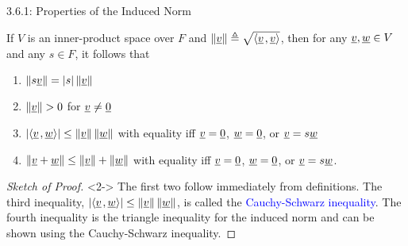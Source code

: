 \documentclass[10pt,english,aspectratio=169]{beamer}
\begin{document}
\begin{frame}{3.6.1: Properties of the Induced Norm}

\begin{theorem}
If $V$ is an inner-product space over $F$ and $\| \underline{v} \| \triangleq \sqrt{{\left\langle  \underline{v}  \mskip2mu ,  \underline{v}  \right\rangle}}$, then for any $\underline{v}, \underline{w} \in V$ and any $s\in F$, it follows that
\begin{enumerate}
\item $\left\| s \underline{v} \right\| = |s| \left\| \underline{v} \right\|$
\item $\left\| \underline{v} \right\| > 0$ for $\underline{v} \neq \underline{0}$
\item $\left| {\left\langle  \underline{v}  \mskip2mu ,  \underline{w}  \right\rangle} \right| \leq \left\| \underline{v} \right\| \left\| \underline{w} \right\|$ with equality iff $\underline{v} = \underline{0}$, $\underline{w}=\underline{0}$, or $\underline{v} = s \underline{w}$
\item $\left\| \underline{v} + \underline{w} \right\| \leq \left\| \underline{v} \right\| + \left\| \underline{w} \right\|$ with equality iff $\underline{v} = \underline{0}$, $\underline{w}=\underline{0}$, or $\underline{v} = s \underline{w}$.
\end{enumerate}
\end{theorem}

\begin{proof}[Sketch of Proof]<2->
The first two follow immediately from definitions.
The third inequality, $\left| {\left\langle  \underline{v}  \mskip2mu ,  \underline{w}  \right\rangle} \right| \leq \left\| \underline{v} \right\| \left\| \underline{w} \right\|$, is called the \textcolor{blue}{Cauchy-Schwarz inequality}.
The fourth inequality is the triangle inequality for the induced norm and can be shown using the Cauchy-Schwarz inequality.
\end{proof}


\end{frame}
\end{document}
